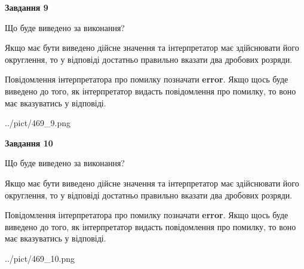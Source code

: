 \documentclass[12pt, ukrainian]{article}
\begin{document}
{\begin {Large}
{\begin {center}\textbf{Завдання 9}\end {center}}\par
Що буде виведено за виконання? \par

Якщо має бути виведено дійсне значення та інтерпретатор має здійснювати його округлення, 
то у відповіді достатньо правильно вказати два дробових розряди.

Повідомлення інтерпретатора про помилку позначати \textbf{error}.
Якщо щось буде виведено до того, як інтерпретатор видасть повідомлення про помилку, 
то воно має вказуватись у відповіді. \par

\begin{center}
	{../pict/469_9.png}
\end{center}
\newpage

{\begin {center}\textbf{Завдання 10}\end {center}}\par
Що буде виведено за виконання? \par

Якщо має бути виведено дійсне значення та інтерпретатор має здійснювати його округлення, 
то у відповіді достатньо правильно вказати два дробових розряди.

Повідомлення інтерпретатора про помилку позначати \textbf{error}.
Якщо щось буде виведено до того, як інтерпретатор видасть повідомлення про помилку, 
то воно має вказуватись у відповіді. \par

\begin{center}
	{../pict/469_10.png}
\end{center}
\newpage

\end {Large}}
\end{document}
